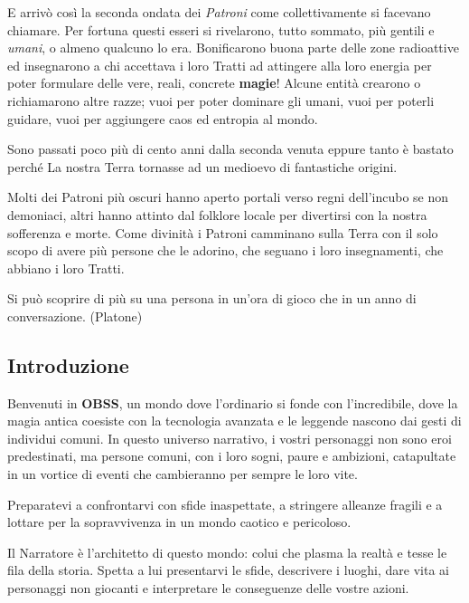 \begin{multicols}{2}
E arrivò così la seconda ondata dei \emph{Patroni} come collettivamente si facevano chiamare. Per fortuna questi esseri si rivelarono, tutto sommato, più gentili e \emph{umani}, o almeno qualcuno lo era. Bonificarono buona parte delle zone radioattive ed insegnarono a chi accettava i loro Tratti ad attingere alla loro energia per poter formulare delle vere, reali, concrete \textbf{magie}!
Alcune entità crearono o richiamarono altre razze; vuoi per poter dominare gli umani, vuoi per poterli guidare, vuoi per aggiungere caos ed entropia al mondo.

Sono passati poco più di cento anni dalla seconda venuta eppure tanto è bastato perché La nostra Terra tornasse ad un medioevo di fantastiche origini.

Molti dei Patroni più oscuri hanno aperto portali verso regni dell'incubo se non demoniaci, altri hanno attinto dal folklore locale per divertirsi con la nostra sofferenza e morte. Come divinità i Patroni camminano sulla Terra con il solo scopo di avere più persone che le adorino, che seguano i loro insegnamenti, che abbiano i loro Tratti.

\medskip

\begin{changemargin}{0.3cm}{0.3cm}\begin{tcolorbox}[enhanced,arc=5pt,boxrule=0.3pt]{Si può scoprire di più su una persona in un'ora di gioco che in un anno di conversazione. (Platone)}\end{tcolorbox}\end{changemargin}

\subsection{Introduzione}

Benvenuti in \textbf{OBSS}, un mondo dove l'ordinario si fonde con l'incredibile, dove la magia antica coesiste con la tecnologia avanzata e le leggende nascono dai gesti di individui comuni. In questo universo narrativo, i vostri personaggi non sono eroi predestinati, ma persone comuni, con i loro sogni, paure e ambizioni, catapultate in un vortice di eventi che cambieranno per sempre le loro vite.

Preparatevi a confrontarvi con sfide inaspettate, a stringere alleanze fragili e a lottare per la sopravvivenza in un mondo caotico e pericoloso.

Il Narratore è l’architetto di questo mondo: colui che plasma la realtà e tesse le fila della storia.
Spetta a lui presentarvi le sfide, descrivere i luoghi, dare vita ai personaggi non giocanti e interpretare le conseguenze delle vostre azioni.


\end{multicols}
